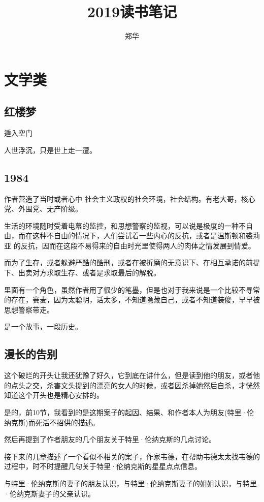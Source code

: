 \documentclass[UTF8,a4paper,12pt]{ctexbook}
\author{\kaishu 郑华}
\title{\heiti 2019读书笔记}
\begin{document}
 	\maketitle

\chapter{文学类}
	\section{红楼梦}
		遁入空门
		
		人世浮沉，只是世上走一遭。
	\section{1984}
		作者营造了当时或者心中 社会主义政权的社会环境，社会结构。有老大哥，核心党、外围党、无产阶级。
		
		生活的环境随时受着电幕的监控，和思想警察的监视，可以说是极度的一种不自由，而在这种不自由的情况下，人们尝试着一些内心的反抗，或者是温斯顿和裘莉亚 的反抗，因而在这段不易得来的自由时光里使得两人的肉体之情发展到情爱。
		
		而为了生存，或者躲避严酷的酷刑，或者在被折磨的无意识下、在相互承诺的前提下、出卖对方求取生存、或者是求取最后的解脱。
		
		里面有一个角色，虽然作者用了很少的笔墨，但是也对于我来说是一个比较不寻常的存在，赛麦，因为太聪明，话太多，不知道隐藏自己，或者不知道装傻，早早被思想警察带走。
		
		是一个故事，一段历史。
		
	\section{漫长的告别}
		这个破烂的开头让我还犹豫了好久，它到底在讲什么，但是读到他的朋友，或者他的点头之交，杀害文头提到的漂亮的女人的时候，或者因杀掉她然后自杀，才恍然知道这个开头也是精心安排的。
		
		是的，前10节，我看到的是这期案子的起因、结果、和作者本人为朋友(特里·伦纳克斯)而死活不招供的描述。
		
		然后再提到了作者朋友的几个朋友关于特里·伦纳克斯的几点讨论。
		
		接下来的几章描述了一个看似不相关的案子，作家韦德，在帮助韦德太太找韦德的过程中，时不时提醒几句关于特里·伦纳克斯的星星点点信息。
		
		与特里·伦纳克斯的妻子的朋友认识，与特里·伦纳克斯妻子的姐姐认识，与特里·伦纳克斯妻子的父亲认识。
		
\end{document}
